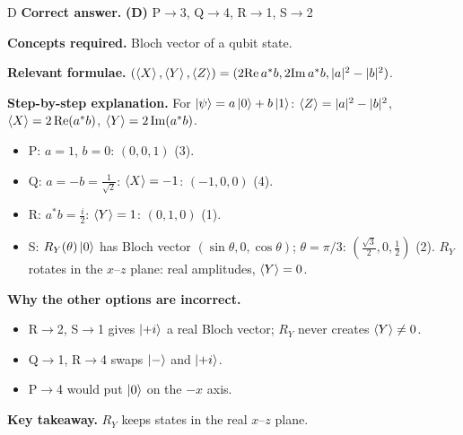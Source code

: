 \documentclass[11pt,a4paper]{article}
\newcommand{\qsep}{\par\vspace{2pt}{\color{black!15}\hrule}\vspace{4pt}}
\begin{document}
\begin{solbox}{D}
\textbf{\color{brand}Correct answer.} \textcolor{okgreen}{\textbf{(D)}} P$\to$3, Q$\to$4, R$\to$1, S$\to$2

\textbf{\color{brand}Concepts required.} Bloch vector of a qubit state.

\textbf{\color{brand}Relevant formulae.} $(\braket X, \braket Y, \braket Z) = (2\mathrm{Re}\,a^*b, 2\mathrm{Im}\,a^*b, |a|^2 - |b|^2)$.

\textbf{\color{brand}Step-by-step explanation.} For $\ket\psi = a\ket0 + b\ket1$: $\braket Z = |a|^2 - |b|^2$, $\braket X = 2\,\mathrm{Re}(a^*b)$, $\braket Y = 2\,\mathrm{Im}(a^*b)$.
\begin{itemize}\itemsep0pt
\item P: $a = 1$, $b = 0$: $(0, 0, 1)$ (3).
\item Q: $a = -b = \frac{1}{\sqrt2}$: $\braket X = -1$: $(-1, 0, 0)$ (4).
\item R: $a^*b = \frac i2$: $\braket Y = 1$: $(0, 1, 0)$ (1).
\item S: $R_Y(\theta)\ket0$ has Bloch vector $(\sin\theta, 0, \cos\theta)$; $\theta = \pi/3$: $(\frac{\sqrt3}{2}, 0, \frac12)$ (2). $R_Y$ rotates in the $x$--$z$ plane:
real amplitudes, $\braket Y = 0$.
\end{itemize}

\textbf{\color{brand}Why the other options are incorrect.}
\begin{itemize}[leftmargin=2.4em, itemsep=1pt, topsep=2pt]
\item[\textbf{(A)}] R$\to$2, S$\to$1 gives $\ket{+i}$ a real Bloch vector; $R_Y$ never creates $\braket Y \neq 0$.
\item[\textbf{(B)}] Q$\to$1, R$\to$4 swaps $\ket-$ and $\ket{+i}$.
\item[\textbf{(C)}] P$\to$4 would put $\ket0$ on the $-x$ axis.
\end{itemize}
\textbf{\color{brand}Key takeaway.} $R_Y$ keeps states in the real $x$--$z$ plane.
\end{solbox}
\qsep
\end{document}

